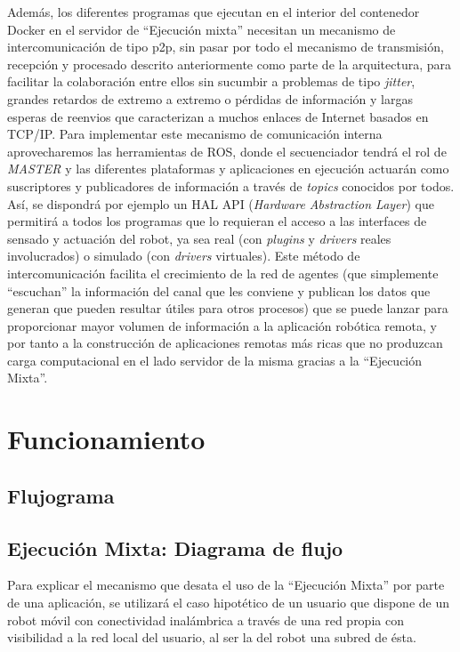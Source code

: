 Además, los diferentes programas que ejecutan en el interior del contenedor Docker en el servidor de ``Ejecución mixta'' necesitan un mecanismo de intercomunicación de tipo p2p, sin pasar por todo el mecanismo de transmisión, recepción y procesado descrito anteriormente como parte de la arquitectura, para facilitar la colaboración entre ellos sin sucumbir a problemas de tipo \textit{jitter}, grandes retardos de extremo a extremo o pérdidas de información y largas esperas de reenvios que caracterizan a muchos enlaces de Internet basados en TCP/IP. Para implementar este mecanismo de comunicación interna aprovecharemos las herramientas de ROS, donde el secuenciador tendrá el rol de \textit{MASTER} y las diferentes plataformas y aplicaciones en ejecución actuarán como suscriptores y publicadores de información a través de \textit{topics} conocidos por todos. Así, se dispondrá por ejemplo un HAL API (\textit{Hardware Abstraction Layer}) que permitirá a todos los programas que lo requieran el acceso a las interfaces de sensado y actuación del robot, ya sea real (con \textit{plugins} y \textit{drivers} reales involucrados) o simulado (con \textit{drivers} virtuales). Este método de intercomunicación facilita el crecimiento de la red de agentes (que simplemente ``escuchan'' la información del canal que les conviene y publican los datos que generan que pueden resultar útiles para otros procesos) que se puede lanzar para proporcionar mayor volumen de información a la aplicación robótica remota, y por tanto a la construcción de aplicaciones remotas más ricas que no produzcan carga computacional en el lado servidor de la misma gracias a la ``Ejecución Mixta''.

\section{Funcionamiento}
\subsection{Flujograma}



\subsection{Ejecución Mixta: Diagrama de flujo}

Para explicar el mecanismo que desata el uso de la ``Ejecución Mixta'' por parte de una aplicación, se utilizará el caso hipotético de un usuario que dispone de un robot móvil con conectividad inalámbrica a través de una red propia con visibilidad a la red local del usuario, al ser la del robot una subred de ésta.

